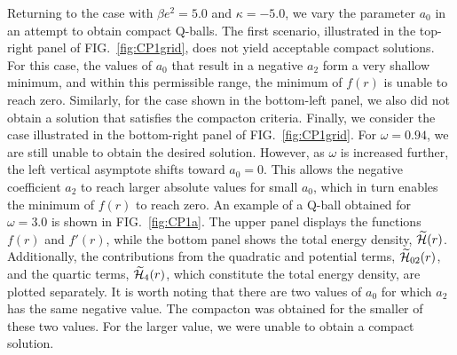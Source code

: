 \documentclass[aps,prd,superscriptaddress,notitlepage,11pt,final,longbibliography,nofootinbib]{revtex4-1}
\numberwithin{equation}{section}
\begin{document}
Returning to the case with $\beta e^2=5.0$ and $\kappa=-5.0$, we vary the parameter $a_0$ in an attempt to obtain compact Q-balls. The first scenario, illustrated in the top-right panel of FIG.~\ref{fig:CP1grid}, does not yield acceptable compact solutions. For this case, the values of $a_0$ that result in a negative $a_2$ form a very shallow minimum, and within this permissible range, the minimum of $f(r)$ is unable to reach zero. Similarly, for the case shown in the bottom-left panel, we also did not obtain a solution that satisfies the compacton criteria. Finally, we consider the case illustrated in the bottom-right panel of FIG.~\ref{fig:CP1grid}. For $\omega=0.94$, we are still unable to obtain the desired solution. However, as $\omega$ is increased further, the left vertical asymptote shifts toward $a_0=0$. This allows the negative coefficient $a_2$ to reach larger absolute values for small $a_0$, which in turn enables the minimum of $f(r)$ to reach zero. An example of a Q-ball obtained for ${\omega=3.0}$ is shown in FIG.~\ref{fig:CP1a}. The upper panel displays the functions $f(r)$ and $f'(r)$, while the bottom panel shows the total energy density, $\widetilde{\cal H}(r)$. Additionally, the contributions from the quadratic and potential terms, $\widetilde{\cal H}_{02}(r)$, and the quartic terms, $\widetilde{\cal H}_{4}(r)$, which constitute the total energy density, are plotted separately. It is worth noting that there are two values of $a_0$ for which $a_2$ has the same negative value. The compacton was obtained for the smaller of these two values. For the larger value, we were unable to obtain a compact solution.
\end{document}

